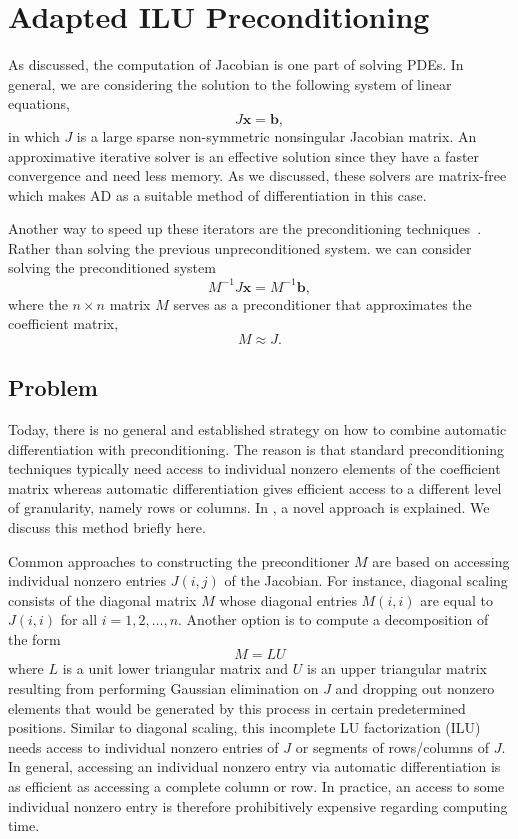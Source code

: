 \documentclass[12pt, twoside]{book}
\newcommand{\vek}[1]{{\ensuremath{\mathbf #1}}}
\begin{document}
\section{Adapted ILU Preconditioning}
\label{s.precond}
As discussed, the computation of Jacobian is one part of solving PDEs.
In general, we are considering the solution to the following system of linear equations,
$$
J\vek{x} = \vek{b},
$$
in which $J$ is a large sparse non-symmetric nonsingular Jacobian matrix. An approximative iterative solver is an
effective solution since they have a faster convergence and need less memory. As we discussed,
these solvers are matrix-free which makes AD as a suitable method of differentiation in this case.

Another way to speed up these iterators are
the preconditioning techniques~\cite{precond1,precond2}.
Rather than solving the previous unpreconditioned system.
we can consider solving the preconditioned system
\begin{equation}
\label{e:precond}
M^{-1} J \vek{x}= M^{-1}\vek{b},
\end{equation}
where the $n \times n$ matrix $M$ serves as a preconditioner that approximates
the coefficient matrix,
$$M \approx J.$$

\subsection{Problem}
\label{ss.problem.precond}
Today, there is no general and established
strategy on how to combine automatic differentiation with preconditioning. The reason is
that standard preconditioning techniques typically need access to individual nonzero
elements of the coefficient matrix whereas automatic differentiation gives efficient
access to a different level of granularity, namely rows or columns.
In \cite{Lulfesmann2012Fap}, a novel approach is explained.
We discuss this method briefly here.

Common approaches to constructing the preconditioner $M$ are based on accessing individual
nonzero entries $J(i,j)$ of the Jacobian. For instance, diagonal scaling consists of the
diagonal matrix $M$ whose diagonal entries $M(i,i)$ are equal to $J(i,i)$ for all
$i=1,2,\dots, n$. Another option is to compute a decomposition of the form
$$M = LU$$
where $L$ is a unit lower triangular matrix and $U$ is an upper triangular matrix
resulting from performing Gaussian elimination on $J$ and dropping out nonzero elements
that would be generated by this process in certain predetermined positions. Similar to
diagonal scaling, this incomplete LU factorization (ILU) needs access to individual
nonzero entries of $J$ or segments of rows/columns of $J$. In general, accessing an
individual nonzero entry via automatic differentiation is as efficient as accessing a
complete column or row. In practice, an access to some individual nonzero entry is
therefore prohibitively expensive regarding computing time.
\end{document}
